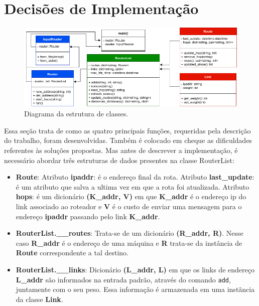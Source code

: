 \section{Decisões de Implementação}
\begin{figure}[h]
	\begin{center}
		\includegraphics[scale=0.55]{fig/uml.png}
	\end{center}
	\caption{\label{fig:digrama} Diagrama da estrutura de classes.}
\end{figure}

Essa seção trata de como as quatro principais funções, requeridas pela descrição
do trabalho, foram desenvolvidas.
Também é colocado em cheque as dificuldades referentes às soluções propostas.
Mas antes de descrever a implementação, é necessário abordar três estruturas de
dados presentes na classe RouterList:
\begin{itemize}
    \item \textbf{Route}: Atributo \textbf{ipaddr}: é o endereço final da rota.
    Atributo \textbf{last\_update}: é um atributo que salva a ultima vez em que
    a rota foi atualizada.
    Atributo \textbf{hops}: é um dicionário \textbf{(K\_addr, V)} em que
    \textbf{K\_addr} é o endereço ip do link associado ao roteador e \textbf{V}
    é o custo de enviar uma mensagem para o endereço \textbf{ipaddr} passando pelo
    link \textbf{K\_addr}.
    \item \textbf{RouterList.\_\_routes}: Trata-se de um dicionário
    \textbf{(R\_addr, R)}. Nesse caso \textbf{R\_addr} é o endereço de uma
    máquina e \textbf{R} trata-se da instância de \textbf{Route} correspondente
    a tal destino.
    \item \textbf{RouterList.\_\_links}: Dicionário \textbf{(L\_addr, L)} em
    que os links de endereço \textbf{L\_addr} são informados na entrada padrão,
    através do comando \texttt{add}, juntamente com o seu peso.
    Essa informação é armazenada em uma instãncia da classe \textbf{Link}.
\end{itemize}


